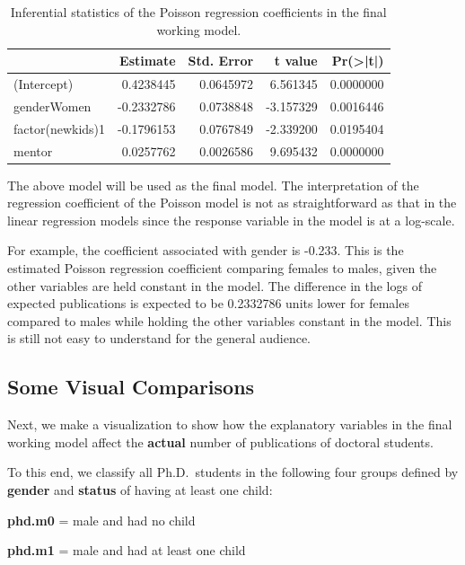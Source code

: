 \documentclass[
]{book}
\begin{document}
\begin{table}

\caption{\label{tab:unnamed-chunk-168}Inferential statistics of 
the Poisson regression coefficients  in the final working model.}
\centering
\begin{tabular}[t]{l|r|r|r|r}
\hline
  & Estimate & Std. Error & t value & Pr(>|t|)\\
\hline
(Intercept) & 0.4238445 & 0.0645972 & 6.561345 & 0.0000000\\
\hline
genderWomen & -0.2332786 & 0.0738848 & -3.157329 & 0.0016446\\
\hline
factor(newkids)1 & -0.1796153 & 0.0767849 & -2.339200 & 0.0195404\\
\hline
mentor & 0.0257762 & 0.0026586 & 9.695432 & 0.0000000\\
\hline
\end{tabular}
\end{table}

The above model will be used as the final model. The interpretation of the regression coefficient of the Poisson model is not as straightforward as that in the linear regression models since the response variable in the model is at a log-scale.

For example, the coefficient associated with gender is -0.233. This is the estimated Poisson regression coefficient comparing females to males, given the other variables are held constant in the model. The difference in the logs of expected publications is expected to be 0.2332786 units lower for females compared to males while holding the other variables constant in the model. This is still not easy to understand for the general audience.

\hypertarget{some-visual-comparisons-1}{%
\subsection{Some Visual Comparisons}\label{some-visual-comparisons-1}}

Next, we make a visualization to show how the explanatory variables in the final working model affect the \textbf{actual} number of publications of doctoral students.

To this end, we classify all Ph.D.~students in the following four groups defined by \textbf{gender} and \textbf{status} of having at least one child:

\textbf{phd.m0} = male and had no child

\textbf{phd.m1} = male and had at least one child
\end{document}
